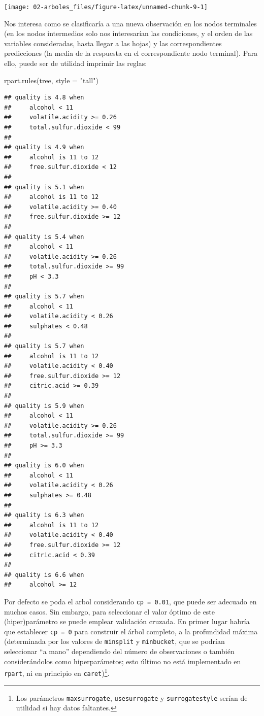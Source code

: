 \documentclass[
]{book}
\newenvironment{Shaded}{\begin{snugshade}}{\end{snugshade}}
\newcommand{\AttributeTok}[1]{\textcolor[rgb]{0.77,0.63,0.00}{#1}}
\newcommand{\FunctionTok}[1]{\textcolor[rgb]{0.00,0.00,0.00}{#1}}
\newcommand{\NormalTok}[1]{#1}
\newcommand{\StringTok}[1]{\textcolor[rgb]{0.31,0.60,0.02}{#1}}
\theoremstyle{break}
\theoremstyle{definition}
\theoremstyle{definition}
\theoremstyle{definition}
\theoremstyle{definition}
\theoremstyle{remark}
\begin{document}
\begin{center}\texttt{[image: 02-arboles\_files/figure-latex/unnamed-chunk-9-1]} \end{center}

Nos interesa como se clasificaría a una nueva observación en los nodos terminales (en los nodos intermedios solo nos interesarían las condiciones, y el orden de las variables consideradas, hasta llegar a las hojas) y las correspondientes predicciones (la media de la respuesta en el correspondiente nodo terminal).
Para ello, puede ser de utilidad imprimir las reglas:

\begin{Shaded}
\begin{Highlighting}[]
\FunctionTok{rpart.rules}\NormalTok{(tree, }\AttributeTok{style =} \StringTok{"tall"}\NormalTok{)}
\end{Highlighting}
\end{Shaded}

\begin{verbatim}
## quality is 4.8 when
##     alcohol < 11
##     volatile.acidity >= 0.26
##     total.sulfur.dioxide < 99
## 
## quality is 4.9 when
##     alcohol is 11 to 12
##     free.sulfur.dioxide < 12
## 
## quality is 5.1 when
##     alcohol is 11 to 12
##     volatile.acidity >= 0.40
##     free.sulfur.dioxide >= 12
## 
## quality is 5.4 when
##     alcohol < 11
##     volatile.acidity >= 0.26
##     total.sulfur.dioxide >= 99
##     pH < 3.3
## 
## quality is 5.7 when
##     alcohol < 11
##     volatile.acidity < 0.26
##     sulphates < 0.48
## 
## quality is 5.7 when
##     alcohol is 11 to 12
##     volatile.acidity < 0.40
##     free.sulfur.dioxide >= 12
##     citric.acid >= 0.39
## 
## quality is 5.9 when
##     alcohol < 11
##     volatile.acidity >= 0.26
##     total.sulfur.dioxide >= 99
##     pH >= 3.3
## 
## quality is 6.0 when
##     alcohol < 11
##     volatile.acidity < 0.26
##     sulphates >= 0.48
## 
## quality is 6.3 when
##     alcohol is 11 to 12
##     volatile.acidity < 0.40
##     free.sulfur.dioxide >= 12
##     citric.acid < 0.39
## 
## quality is 6.6 when
##     alcohol >= 12
\end{verbatim}

Por defecto se poda el arbol considerando \texttt{cp\ =\ 0.01}, que puede ser adecuado en muchos casos.
Sin embargo, para seleccionar el valor óptimo de este (hiper)parámetro se puede emplear validación cruzada.
En primer lugar habría que establecer \texttt{cp\ =\ 0} para construir el árbol completo, a la profundidad máxima
(determinada por los valores de \texttt{minsplit} y \texttt{minbucket}, que se podrían seleccionar
``a mano'' dependiendo del número de observaciones o también considerándolos como hiperparámetos; esto último no está implementado en \texttt{rpart}, ni en principio en \texttt{caret})\footnote{Los parámetros \texttt{maxsurrogate}, \texttt{usesurrogate} y \texttt{surrogatestyle} serían de utilidad si hay datos faltantes.}.
\end{document}
